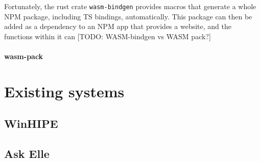 Fortunately, the rust crate \verb|wasm-bindgen| provides macros that generate a whole NPM package, including TS bindings, automatically. This package can then be added as a dependency to an NPM app that provides a website, and the functions within it can [TODO: WASM-bindgen vs WASM pack?]

\paragraph{wasm-pack}
\label{bg:wasm-pack}

\section{Existing systems}
\subsection{WinHIPE}

\subsection{Ask Elle}

